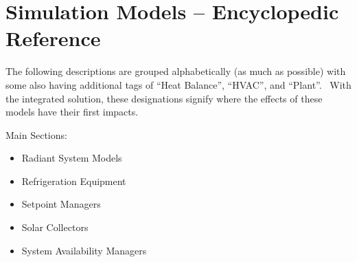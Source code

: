 \chapter{Simulation Models -- Encyclopedic Reference}\label{simulation-models-encyclopedic-reference-004}

The following descriptions are grouped alphabetically (as much as possible) with some also having additional tags of ``Heat Balance'', ``HVAC'', and ``Plant''.~ With the integrated solution, these designations signify where the effects of these models have their first impacts.

Main Sections:

\begin{itemize}
  \tightlist
  \item Radiant System Models
  \item Refrigeration Equipment
  \item Setpoint Managers
  \item Solar Collectors
  \item System Availability Managers 
\end{itemize}
